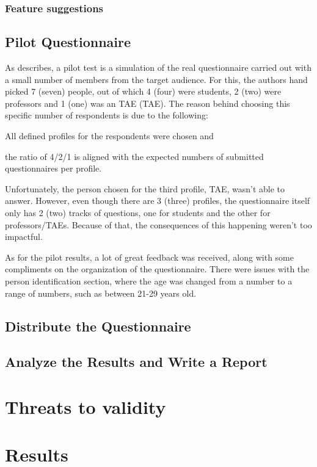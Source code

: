 \subsubsection{Feature suggestions}

\subsection{Pilot Questionnaire}\label{sec:survey-pilot}

As  describes, a pilot test is a simulation of the real questionnaire carried out with a small number of members from the target audience. For this, the authors hand picked 7 (seven) people, out of which 4 (four) were students, 2 (two) were professors and 1 (one) was an \acl{TAE} (\ac{TAE}). The reason behind choosing this specific number of respondents is due to the following:
\begin{inparaenum}[(i)]
  \item All defined profiles for the respondents were chosen and
  \item the ratio of 4/2/1 is aligned with the expected numbers of submitted questionnaires per profile.
\end{inparaenum}

Unfortunately, the person chosen for the third profile, \ac{TAE}, wasn't able to answer. However, even though there are 3 (three) profiles, the questionnaire itself only has 2 (two) tracks of questions, one for students and the other for professors/\acp{TAE}. Because of that, the consequences of this happening weren't too impactful.

As for the pilot results, a lot of great feedback was received, along with some compliments on the organization of the questionnaire. There were issues with the person identification section, where the age was changed from a number to a range of numbers, such as between 21-29 years old.

\subsection{Distribute the Questionnaire}\label{sec:survey-distribute}

\subsection{Analyze the Results and Write a Report}\label{sec:survey-analyse}

\section{Threats to validity}\label{sec:survey-validity}


\section{Results}\label{sec:survey-results}